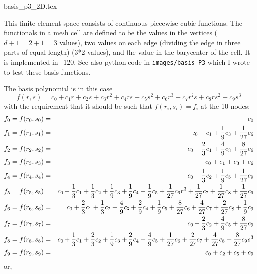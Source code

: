 \begin{flushright} {\tiny {\color{gray} basis\_p3\_2D.tex}} \end{flushright}

This finite element space consists of continuous piecewise cubic functions.
The functionals in a mesh cell are defined to be the values in the vertices ($d+1=2+1=3$ values), 
two values on each edge (dividing the edge in three parts of equal length) (3*2 values), 
and the value in the barycenter of the cell. 
It is implemented in \stone~120.
See also python code in {\tt images/basis\_P3} which I wrote to test these basis functions.




The basis polynomial is in this case
\[
f(r,s) = c_0 + c_1 r+ c_2 s + c_3r^2 + c_4 rs + c_5 s^2
+c_6 r^3 + c_7 r^2s + c_8 rs^2 + c_9 s^3
\]
with the requirement that it should be such that $f(r_i,s_i)=f_i$ at the 10 nodes:
\begin{eqnarray}
f_0 = f(r_0,s_0) &=& c_0 \nonumber\\
f_1 = f(r_1,s_1) &=& c_0 + c_1 + \frac19 c_3 + \frac{1}{27} c_6 \nonumber\\
f_2 = f(r_2,s_2) &=& c_0 + \frac23 c_1 + \frac{4}{9} c_3 + \frac{8}{27} c_6\nonumber\\
f_3 = f(r_3,s_3) &=& c_0 + c_1 + c_3 + c_6 \nonumber\\
f_4 = f(r_4,s_4) &=& c_0 + \frac13 c_2   + \frac19 c_5 + \frac{1}{27} c_9 \nonumber\\
f_5 = f(r_5,s_5) &=& c_0 + \frac13 c_1 + \frac13 c_2 + \frac19 c_3 
+ \frac19 c_4  + \frac19 c_5 + \frac{1}{27}c_6 r^3 + \frac{1}{27}c_7 + \frac{1}{27}c_8 + \frac{1}{27} c_9 \nonumber\\
f_6 = f(r_6,s_6) &=& c_0 + \frac23 c_1 + \frac13 c_2  
+ \frac49 c_3+ \frac29 c_4 + \frac19 c_5 + \frac{8}{27}c_6 +\frac{4}{27} c_7 +\frac{2}{27} c_8 +\frac19 c_9 \nonumber\\
f_7 = f(r_7,s_7) &=& c_0 + \frac23 c_2  + \frac49c_5 + \frac{8}{27}c_9 \nonumber\\
f_8 = f(r_8,s_8) &=& c_0 + \frac13c_1 + \frac23 c_2 + \frac19 c_3
+ \frac29 c_4  + \frac49 c_5 
+ \frac{1}{27}c_6  + \frac{2}{27}c_7  + \frac{4}{27}c_8 + \frac{8}{27}c_9 s^3 \nonumber\\
f_9 = f(r_9,s_9) &=& c_0 + c_2 + c_5 + c_9 \nonumber 
\end{eqnarray}
or,
